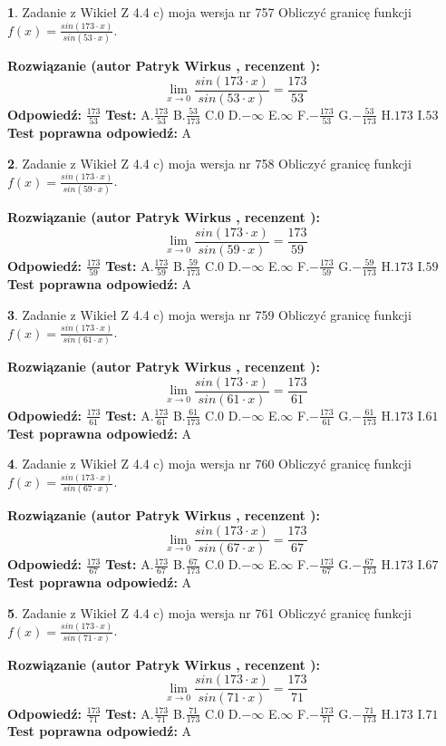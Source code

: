 \documentclass[12pt, a4paper]{article}
\theoremstyle{definition} %
\newtheorem{zad}{}
\newcommand{\zadStart}[1]{\begin{zad}#1\newline}
\newcommand{\zadStop}{\end{zad}}
\newcommand{\rozwStart}[2]{\noindent \textbf{Rozwiązanie (autor #1 , recenzent #2): }\newline}
\newcommand{\rozwStop}{\newline}
\newcommand{\odpStart}{\noindent \textbf{Odpowiedź:}\newline}
\newcommand{\odpStop}{\newline}
\newcommand{\testStart}{\noindent \textbf{Test:}\newline}
\newcommand{\testStop}{\newline}
\newcommand{\kluczStart}{\noindent \textbf{Test poprawna odpowiedź:}\newline}
\newcommand{\kluczStop}{\newline}
\begin{document}
\zadStart{Zadanie z Wikieł Z 4.4 c) moja wersja nr 757}
Obliczyć granicę funkcji $f(x)=\frac{sin(173\cdot x)}{sin(53\cdot x)}$.
\zadStop
\rozwStart{Patryk Wirkus}{}
$$\lim\limits_{x\to 0}\frac{sin(173\cdot x)}{sin(53\cdot x)}=
\frac{173}{53}$$
\rozwStop
\odpStart
$\frac{173}{53}$
\odpStop
\testStart
A.$\frac{173}{53}$
B.$\frac{53}{173}$
C.$0$
D.$-\infty$
E.$\infty$
F.$-\frac{173}{53}$
G.$-\frac{53}{173}$
H.$173$
I.$53$
\testStop
\kluczStart
A
\kluczStop



\zadStart{Zadanie z Wikieł Z 4.4 c) moja wersja nr 758}
Obliczyć granicę funkcji $f(x)=\frac{sin(173\cdot x)}{sin(59\cdot x)}$.
\zadStop
\rozwStart{Patryk Wirkus}{}
$$\lim\limits_{x\to 0}\frac{sin(173\cdot x)}{sin(59\cdot x)}=
\frac{173}{59}$$
\rozwStop
\odpStart
$\frac{173}{59}$
\odpStop
\testStart
A.$\frac{173}{59}$
B.$\frac{59}{173}$
C.$0$
D.$-\infty$
E.$\infty$
F.$-\frac{173}{59}$
G.$-\frac{59}{173}$
H.$173$
I.$59$
\testStop
\kluczStart
A
\kluczStop



\zadStart{Zadanie z Wikieł Z 4.4 c) moja wersja nr 759}
Obliczyć granicę funkcji $f(x)=\frac{sin(173\cdot x)}{sin(61\cdot x)}$.
\zadStop
\rozwStart{Patryk Wirkus}{}
$$\lim\limits_{x\to 0}\frac{sin(173\cdot x)}{sin(61\cdot x)}=
\frac{173}{61}$$
\rozwStop
\odpStart
$\frac{173}{61}$
\odpStop
\testStart
A.$\frac{173}{61}$
B.$\frac{61}{173}$
C.$0$
D.$-\infty$
E.$\infty$
F.$-\frac{173}{61}$
G.$-\frac{61}{173}$
H.$173$
I.$61$
\testStop
\kluczStart
A
\kluczStop



\zadStart{Zadanie z Wikieł Z 4.4 c) moja wersja nr 760}
Obliczyć granicę funkcji $f(x)=\frac{sin(173\cdot x)}{sin(67\cdot x)}$.
\zadStop
\rozwStart{Patryk Wirkus}{}
$$\lim\limits_{x\to 0}\frac{sin(173\cdot x)}{sin(67\cdot x)}=
\frac{173}{67}$$
\rozwStop
\odpStart
$\frac{173}{67}$
\odpStop
\testStart
A.$\frac{173}{67}$
B.$\frac{67}{173}$
C.$0$
D.$-\infty$
E.$\infty$
F.$-\frac{173}{67}$
G.$-\frac{67}{173}$
H.$173$
I.$67$
\testStop
\kluczStart
A
\kluczStop



\zadStart{Zadanie z Wikieł Z 4.4 c) moja wersja nr 761}
Obliczyć granicę funkcji $f(x)=\frac{sin(173\cdot x)}{sin(71\cdot x)}$.
\zadStop
\rozwStart{Patryk Wirkus}{}
$$\lim\limits_{x\to 0}\frac{sin(173\cdot x)}{sin(71\cdot x)}=
\frac{173}{71}$$
\rozwStop
\odpStart
$\frac{173}{71}$
\odpStop
\testStart
A.$\frac{173}{71}$
B.$\frac{71}{173}$
C.$0$
D.$-\infty$
E.$\infty$
F.$-\frac{173}{71}$
G.$-\frac{71}{173}$
H.$173$
I.$71$
\testStop
\kluczStart
A
\kluczStop
\end{document}
